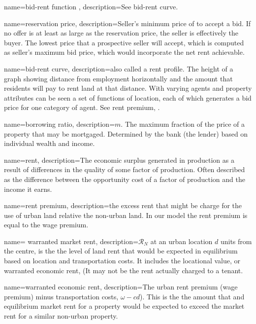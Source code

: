 {
name=bid-rent function ,
description={See \gls{bid-rent curve}.}
}

{
name=reservation price,
description={Seller's minimum price of to accept a bid. If no offer is at least as large as the reservation price, the seller is effectively the buyer. The lowest price that a prospective seller will accept, which is computed as  seller's maximum bid price, which would incorporate the net rent achievable.}
}


{
name=bid-rent curve,
description={also called a rent profile. The height of a graph showing distance from employment horizontally and the amount that residents will pay to rent land at that distance. With varying agents and property attributes can be seen a set of functions of location, each of which  generates a bid price for one category of agent.   See \gls{rent premium}, .}
}

{
name=borrowing ratio,
description={$m$. The maximum fraction of the price of a property that may be mortgaged. Determined by the bank (the lender) based on individual wealth and income. }
}

{
name=rent,
description={The economic  surplus generated in production as a result of differences in the quality of some factor of production. Often described as the difference between the opportunity cost of a factor of production and the income it earns. }
}

{
name=rent premium,
description={the excess rent  that might be charge for the use of urban land relative the non-urban land. In our model the rent premium is equal to the wage premium. }
}

{
name= warranted market rent,
description={$\mathcal{R}_N$ at an  urban location  $d$ units from the centre, is the the level of land rent that would be expected in equilibrium based on location and transportation costs. It includes the locational value, or \gls{warranted economic rent}, (It may not be the rent actually charged to a tenant. }
}

{
name=warranted economic rent,
description={The urban rent premium (wage premium) minus transportation costs, $\omega-{c} d$). This is the the amount that and equilibrium market rent for a property would be expected to exceed the market rent for a similar non-urban property.}
}


